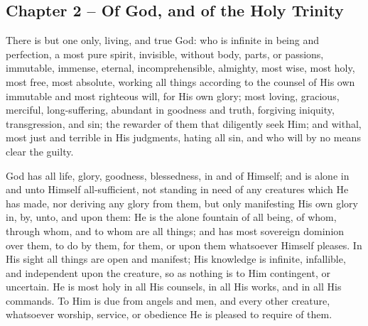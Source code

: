 \begin{outerlst}[left=0pt,labelsep=0pt]
\section{Chapter 2 -- Of God, and of the Holy Trinity} 
\begin{innerlst}[resume*]

\item There is but one only, living, and true God: who is infinite in being and perfection, a most pure spirit, invisible, without body, parts, or passions, immutable, immense, eternal, incomprehensible, almighty, most wise, most holy, most free, most absolute, working all things according to the counsel of His own immutable and most righteous will, for His own glory; most loving, gracious, merciful, long-suffering, abundant in goodness and truth, forgiving iniquity, transgression, and sin; the rewarder of them that diligently seek Him; and withal, most just and terrible in His judgments, hating all sin, and who will by no means clear the guilty.    

\item God has all life, glory, goodness, blessedness, in and of Himself; and is alone in and unto Himself all-sufficient, not standing in need of any creatures which He has made, nor deriving any glory from them, but only manifesting His own glory in, by, unto, and upon them: He is the alone fountain of all being, of whom, through whom, and to whom are all things; and has most sovereign dominion over them, to do by them, for them, or upon them whatsoever Himself pleases. In His sight all things are open and manifest; His knowledge is infinite, infallible, and independent upon the creature, so as nothing is to Him contingent, or uncertain. He is most holy in all His counsels, in all His works, and in all His commands. To Him is due from angels and men, and every other creature, whatsoever worship, service, or obedience He is pleased to require of them.    


\end{innerlst}
\end{outerlst}
